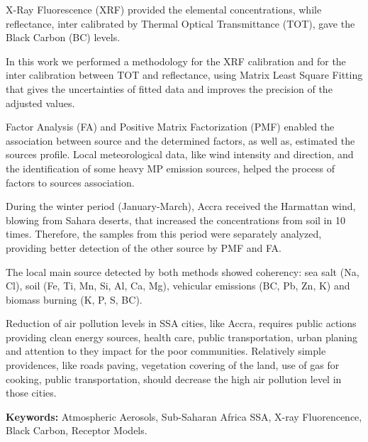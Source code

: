 X-Ray Fluorescence (XRF) provided the elemental concentrations, while 
reflectance, inter calibrated by Thermal Optical Transmittance (TOT), gave the Black 
Carbon (BC) levels. 

In this work we performed a methodology for the XRF calibration and for 
the inter calibration between TOT and reflectance, using Matrix Least Square Fitting that gives the uncertainties of 
fitted data and improves the precision of the adjusted values.

Factor Analysis (FA) and Positive Matrix Factorization (PMF) 
enabled the association between source and the determined factors, 
as well as, estimated the sources profile. Local meteorological data, like wind intensity and direction, 
and the identification of some heavy MP emission sources, 
helped the process of factors to sources association. 

During the winter period (January-March), Accra received the 
Harmattan wind, blowing from Sahara deserts, that increased
the concentrations from soil in 10 times. Therefore, the samples from 
this period were separately analyzed, providing better detection 
of the other source by PMF and FA.

The local main source detected by both methods showed coherency: 
sea salt (Na, Cl), soil (Fe, Ti, Mn, Si, Al, Ca, Mg), 
vehicular emissions (BC, Pb, Zn, K) and biomass burning (K, P, S, BC).




Reduction of air pollution levels in SSA cities, like Accra, 
requires public actions providing clean energy sources, health care, 
public transportation, urban planing and attention to they impact for 
the poor communities. Relatively simple providences, like roads paving, vegetation 
covering of the land, use of gas for cooking, public transportation, 
should decrease the high air pollution level in those cities.

\par
\vspace{1em}
\noindent\textbf{Keywords:} Atmospheric Aerosols, Sub-Saharan Africa SSA,
X-ray Fluorencence, Black Carbon, Receptor Models.

